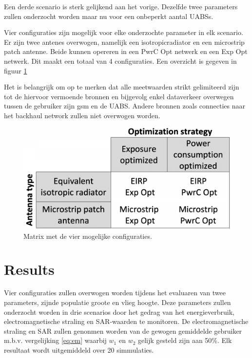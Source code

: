 \documentclass[twocolumn]{phdsymp} %
\begin{document}
Een derde scenario is sterk gelijkend aan het vorige. Dezelfde twee parameters zullen onderzocht 
worden maar nu voor een onbeperkt aantal \gls{UABS}s.

Vier configuraties zijn mogelijk voor elke onderzochte parameter in elk scenario.
Er zijn twee antenes overwogen, namelijk een \gls{isotropicradiator} en een microstrip patch antenne.
Beide kunnen opereren in een \gls{PwrC Opt} netwerk en een \gls{Exp Opt} netwerk. Dit maakt een totaal van 4 configuraties.
Een overzicht is gegeven in figuur \ref{fig:fourCasesMatrix}

Het is belangrijk om op te merken dat alle meetwaarden strikt gelimiteerd zijn tot de hiervoor vermoende bronnen en 
bijgevolg enkel dataverkeer overwegen tussen de gebruiker zijn gsm en de \gls{UABS}. 
Andere bronnen zoals connecties naar het backhaul network zullen niet overwogen worden.

\begin{figure}[h!]
  \includegraphics[width=\linewidth]{fourCasesMatrix.png}
  \caption{Matrix met de vier mogelijke configuraties.}
  \label{fig:fourCasesMatrix}
\end{figure}

\section{Results}
Vier configuraties zullen overwogen worden tijdens het evaluaren van twee parameters, zijnde 
populatie groote en vlieg hoogte. Deze parameters zullen onderzocht worden in drie scenarios 
door het gedrag van het energieverbruik, electromagnetische straling en \gls{SAR}-waarden te monitoren.
De electromagnetische straling en \gls{SAR} zullen genonmen worden van de gewogen gemiddelde gebruiker
m.b.v. vergelijking \ref{eq:em} waarbij $w_{1}$ en $w_{2}$ gelijk gesteld zijn aan 50\%. 
Elk resultaat wordt uitgemiddeld over 20 simmulaties.
\end{document}
